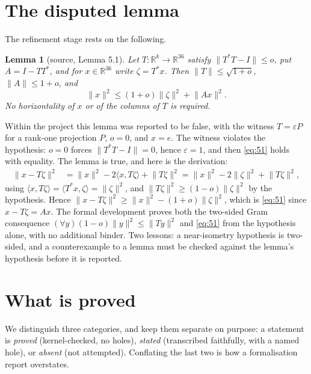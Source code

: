 \documentclass[11pt]{article}
\newtheorem{lemma}[theorem]{Lemma}
\theoremstyle{definition}
\newcommand{\R}{\mathbb{R}}
\newcommand{\inner}[2]{\langle #1,#2\rangle}
\newcommand{\norm}[1]{\lVert #1\rVert}
\begin{document}
\section{The disputed lemma}
\label{sec:l51}

The refinement stage rests on the following.

\begin{lemma}[source, Lemma 5.1]\label{lem:51}
Let $T:\R^k\to\R^{36}$ satisfy $\norm{T^*T-I}\le o$, put $A=I-TT^*$, and for $x\in\R^{36}$ write
$\zeta=T^*x$. Then $\norm T\le\sqrt{1+o}$, $\norm A\le 1+o$, and
\begin{equation}\label{eq:51}
\norm{x}^2\le (1+o)\norm{\zeta}^2+\norm{Ax}^2 .
\end{equation}
No horizontality of $x$ or of the columns of $T$ is required.
\end{lemma}

Within the project this lemma was reported to be false, with the witness $T=\varepsilon P$ for a
rank-one projection $P$, $o=0$, and $x=e$. The witness violates the hypothesis: $o=0$ forces
$\norm{T^*T-I}=0$, hence $\varepsilon=1$, and then \eqref{eq:51} holds with equality. The lemma is
true, and here is the derivation:
\begin{align*}
\norm{x-T\zeta}^2
&=\norm x^2-2\inner{x}{T\zeta}+\norm{T\zeta}^2
 =\norm x^2-2\norm\zeta^2+\norm{T\zeta}^2,
\end{align*}
using $\inner{x}{T\zeta}=\inner{T^*x}{\zeta}=\norm\zeta^2$, and $\norm{T\zeta}^2\ge(1-o)\norm\zeta^2$
by the hypothesis. Hence
$\norm{x-T\zeta}^2\ge\norm x^2-(1+o)\norm\zeta^2$, which is \eqref{eq:51} since $x-T\zeta=Ax$.
The formal development proves both the two-sided Gram consequence
$(\forall y)(1-o)\norm y^2\le\norm{Ty}^2$ and \eqref{eq:51} from the hypothesis alone, with no
additional binder. Two lessons: a near-isometry hypothesis is two-sided, and a counterexample to a
lemma must be checked against the lemma's hypothesis before it is reported.

\section{What is proved}
\label{sec:proved}

We distinguish three categories, and keep them separate on purpose: a statement is \emph{proved}
(kernel-checked, no holes), \emph{stated} (transcribed faithfully, with a named hole), or
\emph{absent} (not attempted). Conflating the last two is how a formalisation report overstates.
\end{document}
